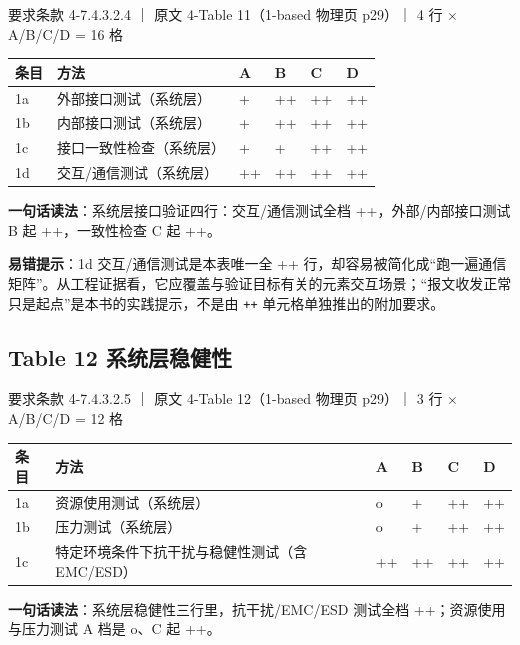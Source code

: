 要求条款 4-7.4.3.2.4 ｜ 原文 4-Table 11（1-based 物理页 p29）｜ 4 行 \(\times\) A/B/C/D = 16 格

\begin{center}
\begingroup\small
\setlength{\tabcolsep}{4pt}
\begin{tabularx}{\linewidth}{@{}XXXXXX@{}}
\toprule
条目 & 方法 & A & B & C & D \\
\midrule
1a & 外部接口测试（系统层） & + & ++ & ++ & ++ \\
1b & 内部接口测试（系统层） & + & ++ & ++ & ++ \\
1c & 接口一致性检查（系统层） & + & + & ++ & ++ \\
1d & 交互/通信测试（系统层） & ++ & ++ & ++ & ++ \\
\bottomrule
\end{tabularx}
\endgroup
\end{center}

\textbf{一句话读法}：系统层接口验证四行：交互/通信测试全档 ++，外部/内部接口测试 B 起 ++，一致性检查 C 起 ++。

\textbf{易错提示}：1d 交互/通信测试是本表唯一全 ++ 行，却容易被简化成“跑一遍通信矩阵”。从工程证据看，它应覆盖与验证目标有关的元素交互场景；“报文收发正常只是起点”是本书的实践提示，不是由 \nolinkurl{++} 单元格单独推出的附加要求。

\subsection{Table 12 系统层稳健性}

要求条款 4-7.4.3.2.5 ｜ 原文 4-Table 12（1-based 物理页 p29）｜ 3 行 \(\times\) A/B/C/D = 12 格

\begin{center}
\begingroup\small
\setlength{\tabcolsep}{4pt}
\begin{tabularx}{\linewidth}{@{}XXXXXX@{}}
\toprule
条目 & 方法 & A & B & C & D \\
\midrule
1a & 资源使用测试（系统层） & o & + & ++ & ++ \\
1b & 压力测试（系统层） & o & + & ++ & ++ \\
1c & 特定环境条件下抗干扰与稳健性测试（含 EMC/ESD） & ++ & ++ & ++ & ++ \\
\bottomrule
\end{tabularx}
\endgroup
\end{center}

\textbf{一句话读法}：系统层稳健性三行里，抗干扰/EMC/ESD 测试全档 ++；资源使用与压力测试 A 档是 o、C 起 ++。

